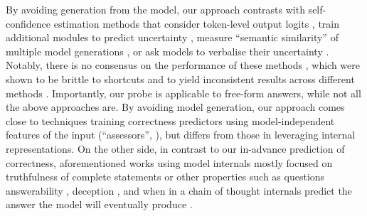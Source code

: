 \documentclass{article} %
\begin{document}
By avoiding generation from the model, our approach contrasts with self-confidence estimation methods \citep{shorinwa2024survey} that consider token-level output logits \citep{fadeeva-etal-2024-fact}, train additional modules to predict uncertainty \citep{DBLP:journals/corr/abs-2207-05221}, measure ``semantic similarity'' of multiple model generations \citep{kuhn2023semantic}, or ask models to verbalise their uncertainty \citep{lin2022teaching, kapoor2024large}. 
Notably, there is no consensus on the performance of these methods \citep{kapoor2024large}, which were shown to be brittle to shortcuts \citep{heindrich2025sparse} and to yield inconsistent results across different methods \citep{pawitan2024confidence}. 
Importantly, our probe is applicable to free-form answers, while not all the above approaches are. 
By avoiding model generation, our approach comes close to techniques training  correctness predictors using model-independent features of the input (``assessors'', \citealp{hernandez2022training, zhou2024predictableartificialintelligence, pacchiardi2025predictaboardbenchmarkingllmscore}), but differs from those in leveraging internal representations. %
On the other side, in contrast to our in-advance prediction of correctness, aforementioned works using model internals mostly focused on truthfulness of complete statements \citep{azaria-mitchell-2023-internal, burns2022discovering, Marks2023TheGO, burger2024truth, bao2025probing} or other properties such as questions answerability \citep{heindrich2025sparse}, deception \citep{yang2024interpretability, goldowsky2025detecting, parrack2025benchmarking}, and when in a chain of thought internals predict the answer the model will eventually produce \citep{Kudo2024ThinktoTalkOT}. 
\end{document}
